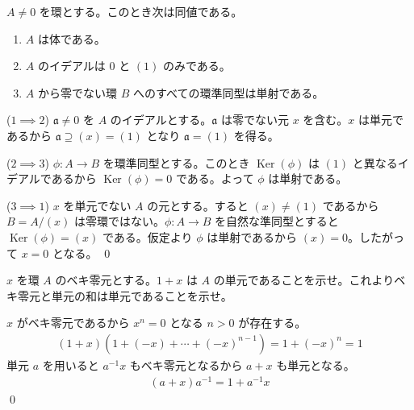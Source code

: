 \documentclass[uplatex,dvipdfmx,a4paper,11pt]{jlreq}
\makeatletter
\DeclareMathOperator{\Kernel}{Ker}
\renewcommand{\aa}{\mathfrak{a}}
\theoremstyle{definition}
\renewenvironment{proof}[1][\proofname]{\par
  \normalfont
  \topsep6\p@\@plus6\p@ \trivlist
  \item[\hskip\labelsep{\bfseries #1}\@addpunct{\bfseries}]\ignorespaces\quad\par
}{%
  \qed\endtrivlist\@endpefalse
}
\renewcommand\proofname{証明}
\makeatother
\begin{document}
\begin{proposition}
  $A\neq 0$ を環とする。このとき次は同値である。
  \begin{enumerate}
    \item $A$ は体である。
    \item $A$ のイデアルは $0$ と $(1)$ のみである。
    \item $A$ から零でない環 $B$ へのすべての環準同型は単射である。
  \end{enumerate}
\end{proposition}
\begin{proof}
  ($1 \implies 2$) $\aa \neq 0$ を $A$ のイデアルとする。$\aa$ は零でない元 $x$ を含む。$x$ は単元であるから $\aa\supseteq (x) = (1)$ となり $\aa = (1)$ を得る。

  ($2 \implies 3$) $\phi: A\to B$ を環準同型とする。このとき $\Kernel(\phi)$ は $(1)$ と異なるイデアルであるから $\Kernel(\phi) = 0$ である。よって $\phi$ は単射である。

  ($3 \implies 1$) $x$ を単元でない $A$ の元とする。すると $(x) \neq (1)$ であるから $B = A/(x)$ は零環ではない。$\phi: A\to B$ を自然な準同型とすると $\Kernel(\phi) = (x)$ である。仮定より $\phi$ は単射であるから $(x) = 0$。したがって $x = 0$ となる。
\end{proof}

\begin{proposition}
  $x$ を環 $A$ のベキ零元とする。$1 + x$ は $A$ の単元であることを示せ。これよりベキ零元と単元の和は単元であることを示せ。
\end{proposition}
\begin{proof}
  $x$ がベキ零元であるから $x^n = 0$ となる $n > 0$ が存在する。
  \begin{align}
    (1 + x)(1 + (-x) + \cdots + (-x)^{n-1}) = 1 + (-x)^n = 1
  \end{align}
  単元 $a$ を用いると $a^{-1}x$ もベキ零元となるから $a + x$ も単元となる。
  \begin{align}
    (a + x)a^{-1} = 1 + a^{-1}x
  \end{align}
\end{proof}
\end{document}
